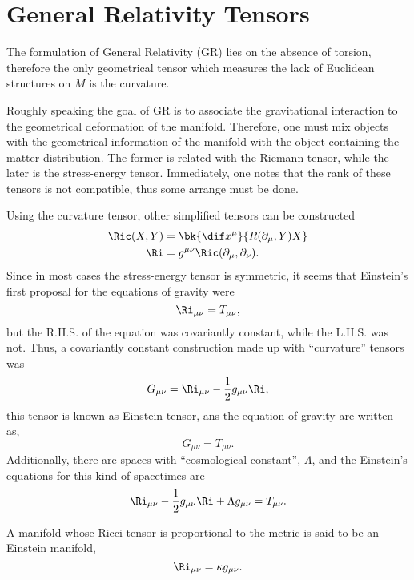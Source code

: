 \section{General Relativity Tensors}

The formulation of General Relativity (GR) lies on the absence of torsion, therefore the only geometrical tensor which measures the lack of Euclidean structures on $M$ is the curvature.

Roughly speaking the goal of GR is to associate the gravitational interaction to the geometrical deformation of the manifold. Therefore, one must mix objects with the geometrical information of the manifold with the object containing the matter distribution. The former is related with the Riemann tensor, while the later is the stress-energy tensor. Immediately, one notes that the rank of these tensors is not compatible, thus some arrange must be done.

Using the curvature tensor, other simplified tensors can be constructed
\begin{align}
  \Ric(X,Y) &= \bk{ \dif x^\mu }{ R( \partial_\mu, Y) X } \\
  \Ri       &= g^{\mu \nu} \Ric( \partial_\mu, \partial_\nu ).
\end{align}
Since in most cases the stress-energy tensor is symmetric, it seems that Einstein's first proposal for the equations of gravity were
\begin{equation}
  \Ri_{\mu \nu} = T_{\mu \nu},
\end{equation}
but the R.H.S. of the equation was covariantly constant, while the L.H.S. was not. Thus, a covariantly constant construction made up with ``curvature'' tensors was
\begin{equation}
  G_{\mu \nu} = \Ri_{\mu \nu} - \frac{1}{2} g_{\mu \nu} \Ri,
\end{equation}
this tensor is known as Einstein tensor, ans the equation of gravity are written as,
\begin{equation}
  G_{\mu \nu} = T_{\mu \nu}.
\end{equation}
Additionally, there are spaces with ``cosmological constant'', $\Lambda$, and the Einstein's equations for this kind of spacetimes are
\begin{equation}
  \Ri_{\mu \nu} - \frac{1}{2}g_{\mu\nu} \Ri + \Lambda g_{\mu \nu} = T_{\mu \nu}.
\end{equation}

A manifold whose Ricci tensor is proportional to the metric is said to be an Einstein manifold,
\begin{equation}
  \Ri_{\mu\nu} = \kappa g_{\mu \nu}.
  \label{def-const-curv}
\end{equation}

